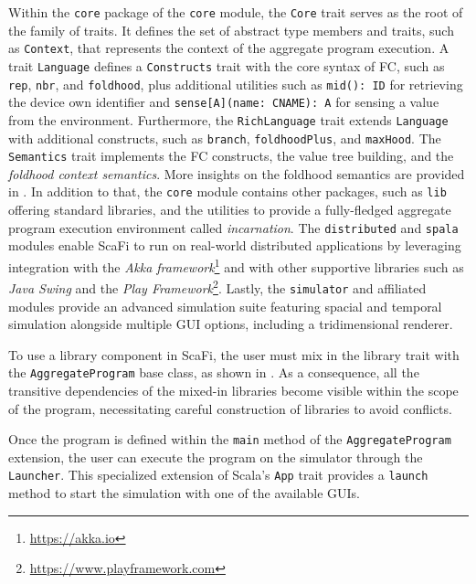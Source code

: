 Within the \texttt{core} package of the \texttt{core} module, the \texttt{Core} trait serves as the root of the family of traits.
%
It defines the set of abstract type members and traits, such as \texttt{Context}, that represents the context of the aggregate program execution.
%
A trait \texttt{Language} defines a \texttt{Constructs} trait with the core syntax of \ac{FC}, such as \texttt{rep}, \texttt{nbr}, and \texttt{foldhood}, plus additional utilities such as \texttt{mid(): ID} for retrieving the device own identifier and \texttt{sense[A](name: CNAME): A} for sensing a value from the environment.
%
Furthermore, the \texttt{RichLanguage} trait extends \texttt{Language} with additional constructs, such as \texttt{branch}, \texttt{foldhoodPlus}, and \texttt{maxHood}.
%
The \texttt{Semantics} trait implements the \ac{FC} constructs, the value tree building, and the \textit{foldhood context semantics}.
%
More insights on the foldhood semantics are provided in .
%
In addition to that, the \texttt{core} module contains other packages, such as \texttt{lib} offering standard libraries, and the utilities to provide a fully-fledged aggregate program execution environment called \textit{incarnation}.
%
The \texttt{distributed} and \texttt{spala} modules enable ScaFi to run on real-world distributed applications by leveraging integration with the \textit{Akka framework}\footnote{\url{https://akka.io}} and with other supportive libraries such as \textit{Java Swing} and the \textit{Play Framework}\footnote{\url{https://www.playframework.com}}.
%
Lastly, the \texttt{simulator} and affiliated modules provide an advanced simulation suite featuring spacial and temporal simulation alongside multiple \ac{GUI} options, including a tridimensional renderer.

To use a library component in ScaFi, the user must mix in the library trait with the \texttt{AggregateProgram} base class, as shown in .
%
As a consequence, all the transitive dependencies of the mixed-in libraries become visible within the scope of the program, necessitating careful construction of libraries to avoid conflicts.



Once the program is defined within the \texttt{main} method of the \texttt{AggregateProgram} extension, the user can execute the program on the simulator through the \texttt{Launcher}.
%
This specialized extension of Scala's \texttt{App} trait provides a \texttt{launch} method to start the simulation with one of the available \acp{GUI}.


